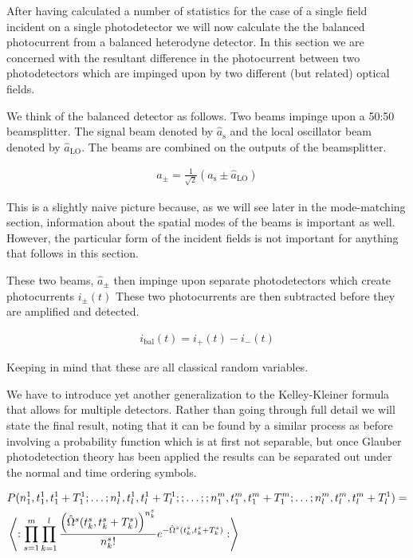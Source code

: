 \documentclass[12pt]{article}
\begin{document}
After having calculated a number of statistics for the case of a single field incident on a single photodetector we will now calculate the the balanced photocurrent from a balanced heterodyne detector. In this section we are concerned with the resultant difference in the photocurrent between two photodetectors which are impinged upon by two different (but related) optical fields.

We think of the balanced detector as follows. Two beams impinge upon a 50:50 beamsplitter. The signal beam denoted by $\hat{a}_{\text{s}}$ and the local oscillator beam denoted by $\hat{a}_{\text{LO}}$. The beams are combined on the outputs of the beamsplitter.

\begin{align}
\label{balphoton}
a_{\pm} = \frac{1}{\sqrt{2}}\left(\hat{a}_{\text{s}} \pm \hat{a}_{\text{LO}}\right)
\end{align}

This is a slightly naive picture because, as we will see later in the mode-matching section, information about the spatial modes of the beams is important as well. However, the particular form of the incident fields is not important for anything that follows in this section.

These two beams, $\hat{a}_{\pm}$ then impinge upon separate photodetectors which create photocurrents $i_{\pm}(t)$ These two photocurrents are then subtracted before they are amplified and detected.

\begin{align}
i_{\text{bal}}(t) = i_+(t) - i_-(t)
\end{align}

Keeping in mind that these are all classical random variables. 

We have to introduce yet another generalization to the Kelley-Kleiner formula that allows for multiple detectors. Rather than going through full detail we will state the final result, noting that it can be found by a similar process as before involving a probability function which is at first not separable, but once Glauber photodetection theory has been applied the results can be separated out under the normal and time ordering symbols.

\begin{align}
&P(n^1_1,t^1_1,t^1_1+T^1_1;\ldots ;n^1_l,t^1_l,t^1_l+T^1_l;; \ldots ;; n^m_1,t^m_1,t^m_1+T^m_1;\ldots ;n^m_l,t^m_l,t^m_l+T^1_l) =\\ 
&\Braket{:\prod_{s=1}^m \prod_{k=1}^l \frac{\left(\hat{\Omega}^s(t^s_k,t^s_k+T^s_k)\right)^{n^s_k}}{n^s_k!} e^{-\hat{\Omega}^s(t^s_k,t^s_k+T^s_k)} :}
\end{align}
\end{document}

